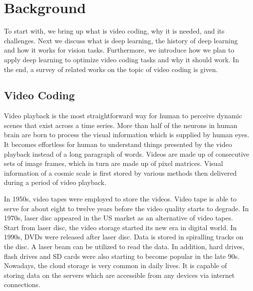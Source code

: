\chapter{Background}\label{ch:chapter2} %
%
%
To start with, we bring up what is video coding, why it is needed, and
its challenges.
Next we discuss what is deep learning, the history of deep learning and how
it works for vision tasks.
Furthermore, we introduce how we plan to apply deep learning to optimize video
coding tasks and why it should work.
In the end, a survey of related works on the topic of video coding is given.

%
\section{Video Coding}\label{sec:video-coding}
Video playback is the most straightforward way for human to perceive dynamic
scenes that exist across a time series.
More than half of the neurons in human brain are born to process the visual
information which is supplied by human eyes.
It becomes effortless for human to understand things presented by
the video playback instead of a long paragraph of words.
Videos are made up of consecutive sets of image frames, which in turn
are made up of pixel matrices.
Visual information of a cosmic scale is first stored by various methods
then delivered during a period of video playback.

In 1950s, video tapes were employed to store the videos.
Video tape is able to serve for about eight to twelve years
before the video quality starts to degrade.
In 1970s, laser disc appeared in the US market as an alternative of video tapes.
Start from laser disc, the video storage started its new era in digital world.
In 1990s, DVDs were released after laser disc.
Data is stored in spiralling tracks on the disc.
A laser beam can be utilized to read the data.
In addition, hard drives, flash drives and SD cards were also starting to
become popular in the late 90s.
Nowadays, the cloud storage is very common in daily lives.
It is capable of storing data on the servers which are
accessible from any devices via internet connections.

